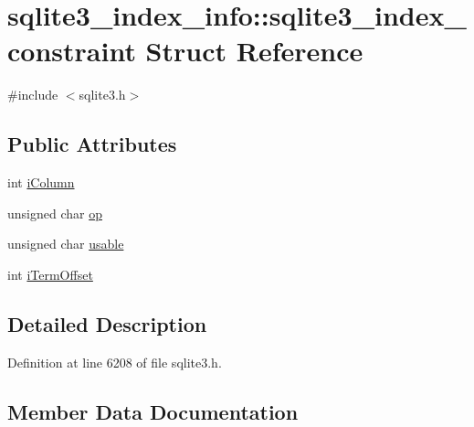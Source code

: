 \hypertarget{structsqlite3__index__info_1_1sqlite3__index__constraint}{}\section{sqlite3\+\_\+index\+\_\+info\+:\+:sqlite3\+\_\+index\+\_\+constraint Struct Reference}
\label{structsqlite3__index__info_1_1sqlite3__index__constraint}


{\ttfamily \#include $<$sqlite3.\+h$>$}

\subsection*{Public Attributes}
\begin{DoxyCompactItemize}
\item 
int \mbox{\hyperlink{structsqlite3__index__info_1_1sqlite3__index__constraint_a0f1e207060420058ee2881f2ea368e3a}{i\+Column}}
\item 
unsigned char \mbox{\hyperlink{structsqlite3__index__info_1_1sqlite3__index__constraint_a362f4ec1f71975cb0ac39a8b5e4b1476}{op}}
\item 
unsigned char \mbox{\hyperlink{structsqlite3__index__info_1_1sqlite3__index__constraint_ae16e62caeab743cc68bb22227dacb501}{usable}}
\item 
int \mbox{\hyperlink{structsqlite3__index__info_1_1sqlite3__index__constraint_a4e8368da66f34b7f07b369984b813d1b}{i\+Term\+Offset}}
\end{DoxyCompactItemize}


\subsection{Detailed Description}


Definition at line 6208 of file sqlite3.\+h.



\subsection{Member Data Documentation}
\mbox{\label{structsqlite3__index__info_1_1sqlite3__index__constraint_a0f1e207060420058ee2881f2ea368e3a}} 
